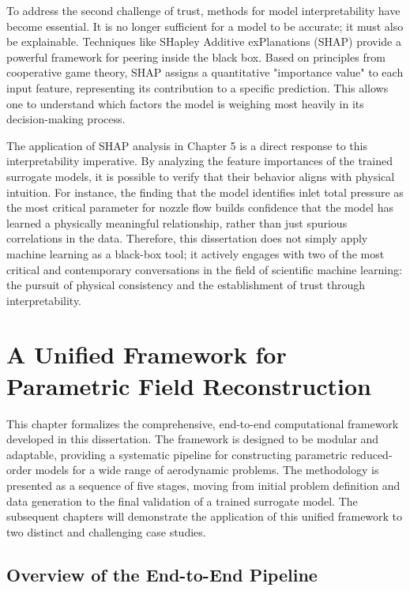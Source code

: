 \documentclass[dscexam, EN]{ufabcFHZh}
\begin{document}
To address the second challenge of trust, methods for model interpretability have become essential. It is no longer sufficient for a model to be accurate; it must also be explainable. Techniques like SHapley Additive exPlanations (SHAP) provide a powerful framework for peering inside the black box. Based on principles from cooperative game theory, SHAP assigns a quantitative "importance value" to each input feature, representing its contribution to a specific prediction. This allows one to understand which factors the model is weighing most heavily in its decision-making process. 

The application of SHAP analysis in Chapter 5 is a direct response to this interpretability imperative. By analyzing the feature importances of the trained surrogate models, it is possible to verify that their behavior aligns with physical intuition. For instance, the finding that the model identifies inlet total pressure as the most critical parameter for nozzle flow builds confidence that the model has learned a physically meaningful relationship, rather than just spurious correlations in the data. Therefore, this dissertation does not simply apply machine learning as a black-box tool; it actively engages with two of the most critical and contemporary conversations in the field of scientific machine learning: the pursuit of physical consistency and the establishment of trust through interpretability. 

\chapter{A Unified Framework for Parametric Field Reconstruction}

This chapter formalizes the comprehensive, end-to-end computational framework developed in this dissertation. The framework is designed to be modular and adaptable, providing a systematic pipeline for constructing parametric reduced-order models for a wide range of aerodynamic problems. The methodology is presented as a sequence of five stages, moving from initial problem definition and data generation to the final validation of a trained surrogate model. The subsequent chapters will demonstrate the application of this unified framework to two distinct and challenging case studies.

\section{Overview of the End-to-End Pipeline}
\end{document}
